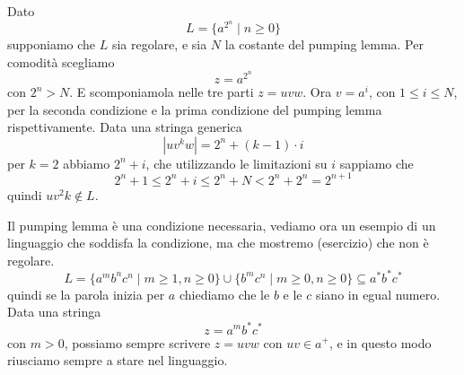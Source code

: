 \documentclass[12pt]{article}
\begin{document}
\begin{tcolorbox}
	Dato
	$$ L = \{ a^{2^n} \mid n \geq 0 \} $$
	supponiamo che $L$ sia regolare, e sia $N$ la costante del pumping lemma.
	Per comodità scegliamo
	$$ z = a^{2^n} $$
	con $2^n > N$.
	E scomponiamola nelle tre parti $z = uvw$. 
	Ora $v = a^i$, con $1 \leq i \leq N$, per la seconda condizione e la prima condizione del pumping lemma rispettivamente.
	Data una stringa generica
	$$ |uv^kw| = 2^n + (k - 1) \cdot i $$
	per $k = 2$ abbiamo $2^n + i$, che utilizzando le limitazioni su $i$ sappiamo che
	$$ 2^n + 1 \leq 2^n + i \leq 2^n + N < 2^n + 2^n = 2^{n + 1} $$
	quindi $uv^2k \not \in L$.
\end{tcolorbox}
Il pumping lemma è una condizione necessaria, vediamo ora un esempio di un linguaggio che soddisfa la condizione, ma che mostremo (esercizio) che non è regolare.
$$ L = \{ a^m b^n c^n \mid m \geq 1, n \geq 0 \} \cup \{ b^m c^n \mid m \geq 0, n \geq 0 \} \subseteq a^* b^* c^* $$
quindi se la parola inizia per $a$ chiediamo che le $b$ e le $c$ siano in egual numero.
Data una stringa 
$$ z = a^m b^* c^* $$
con $m > 0$, possiamo sempre scrivere $z = u v w$ con $uv \in a^+$, e in questo modo riusciamo sempre a stare nel linguaggio.
\end{document}

